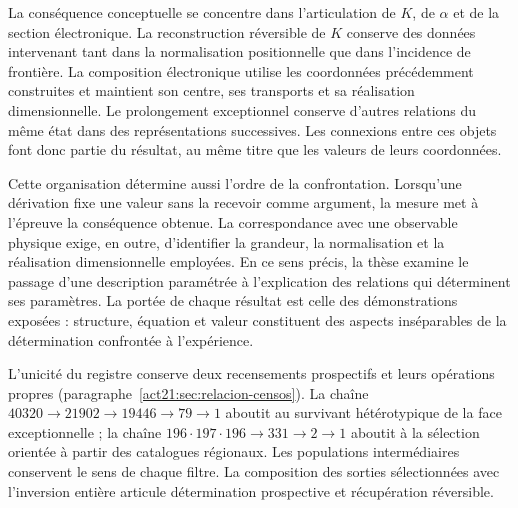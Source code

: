 La conséquence conceptuelle se concentre dans l'articulation de \(K\),
de \(\alpha\) et de la section électronique. La reconstruction réversible de
\(K\) conserve des données intervenant tant dans la normalisation positionnelle
que dans l'incidence de frontière. La composition électronique utilise les
coordonnées précédemment construites et maintient son centre, ses transports
et sa réalisation dimensionnelle. Le prolongement exceptionnel conserve d'autres
relations du même état dans des représentations successives. Les connexions
entre ces objets font donc partie du résultat, au même titre que les
valeurs de leurs coordonnées.

Cette organisation détermine aussi l'ordre de la confrontation. Lorsqu'une
dérivation fixe une valeur sans la recevoir comme argument, la mesure
met à l'épreuve la conséquence obtenue. La correspondance avec une
observable physique exige, en outre, d'identifier la grandeur, la normalisation
et la réalisation dimensionnelle employées. En ce sens précis, la thèse
examine le passage d'une description paramétrée à l'explication des
relations qui déterminent ses paramètres. La portée de chaque résultat
est celle des démonstrations exposées : structure, équation et valeur
constituent des aspects inséparables de la détermination confrontée à l'expérience.

L'unicité du registre conserve deux recensements prospectifs et leurs
opérations propres (paragraphe~\ref{act21:sec:relacion-censos}).
La chaîne \(40320\to21902\to19446\to79\to1\) aboutit au
survivant hétérotypique de la face exceptionnelle ; la chaîne
\(196\cdot197\cdot196\to331\to2\to1\) aboutit à la sélection
orientée à partir des catalogues régionaux. Les populations intermédiaires
conservent le sens de chaque filtre. La composition des sorties
sélectionnées avec l'inversion entière articule détermination
prospective et récupération réversible.
